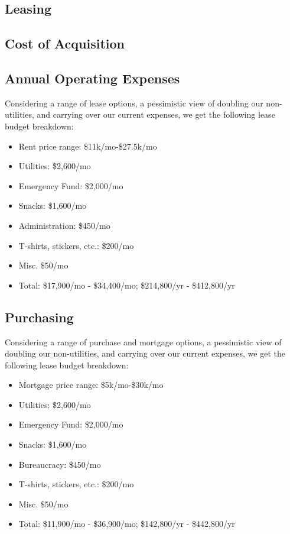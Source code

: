 \documentclass[12pt]{article}
\begin{document}
\subsection{Leasing}

\subsection{Cost of Acquisition}

\subsection{Annual Operating Expenses}

Considering a range of lease options, a pessimistic view of doubling our non-utilities, and carrying over our current expenses, we get the following lease budget breakdown:

\begin{itemize}
    \item Rent price range: \$11k/mo-\$27.5k/mo
    \item Utilities: \$2,600/mo
    \item Emergency Fund: \$2,000/mo
    \item Snacks: \$1,600/mo
    \item Administration: \$450/mo
    \item T-shirts, stickers, etc.: \$200/mo
    \item Misc. \$50/mo
    \item Total: \$17,900/mo - \$34,400/mo; \$214,800/yr - \$412,800/yr
\end{itemize}

\subsection{Purchasing}

Considering a range of purchase and mortgage options, a pessimistic view of doubling our non-utilities, and carrying over our current expenses, we get the following lease budget breakdown:

\begin{itemize}
    \item Mortgage price range: \$5k/mo-\$30k/mo
    \item Utilities: \$2,600/mo
    \item Emergency Fund: \$2,000/mo
    \item Snacks: \$1,600/mo
    \item Bureaucracy: \$450/mo
    \item T-shirts, stickers, etc.: \$200/mo
    \item Misc. \$50/mo
    \item Total: \$11,900/mo - \$36,900/mo;  \$142,800/yr - \$442,800/yr
\end{itemize}
\end{document}
